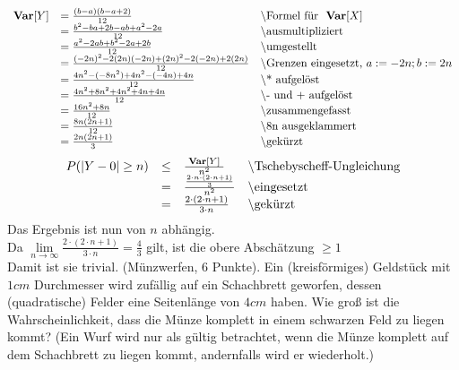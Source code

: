 \documentclass[twoside]{article}
\begin{document}
		\sss
		    \begin{equation*}
				\begin{array}{lll}
					\textbf{Var}[Y]	&=	\frac{(b-a)(b-a+2)}{12}	&$\textbackslash Formel für \var{X}$\\
									&=	\frac{b^2-ba+2b-ab+a^2-2a}{12}	&$\textbackslash ausmultipliziert$\\
									&=	\frac{a^2-2ab+b^2-2a+2b}{12}	&$\textbackslash umgestellt$\\
									&=	\frac{(-2n)^2-2(2n)(-2n)+(2n)^2-2(-2n)+2(2n)}{12}&$\textbackslash Grenzen eingesetzt, $a:=-2n; b:=2n\\
									&=	\frac{4n^2-(-8n^2)+4n^2-(-4n)+4n}{12}&$\textbackslash * aufgelöst$\\
									&=	\frac{4n^2+8n^2+4n^2+4n+4n}{12}&$\textbackslash - und + aufgelöst$\\
									&=	\frac{16n^2+8n}{12}&$\textbackslash zusammengefasst$\\
									&=	\frac{8n(2n+1)}{12}&$\textbackslash 8n ausgeklammert$\\
									&=	\frac{2n(2n+1)}{3}&$\textbackslash gekürzt$\\
				\end{array}
			\end{equation*}
		\sss
    \begin{equation*}
        \begin{array}{rlll}
            P(|Y-0| \geq n) &\leq& \frac{\text{\var{Y}}}{n^2}&$\textbackslash Tschebyscheff-Ungleichung$\\
            &=&\frac{\frac{2\cdot n \cdot(2\cdot n +1)}{3}}{n^2}&$\textbackslash eingesetzt$\\
            &=&\frac{2 \cdot(2\cdot n +1)}{3\cdot n}&$\textbackslash gekürzt$
        \end{array}
    \end{equation*}
    Das Ergebnis ist nun von $n$ abhängig.\\
    Da $\lim\limits_{n \to \infty}\frac{2 \cdot(2\cdot n +1)}{3\cdot n} = \frac{4}{3}$ gilt, ist die obere Abschätzung $\geq 1$\\
    Damit ist sie trivial.
		(Münzwerfen, 6 Punkte).
		Ein (kreisförmiges) Geldstück mit $1cm$ Durchmesser wird zufällig auf ein Schachbrett geworfen, dessen (quadratische) Felder eine Seitenlänge von $4cm$ haben.
		Wie groß ist die Wahrscheinlichkeit, dass die Münze komplett in einem schwarzen Feld zu liegen kommt?
		(Ein Wurf wird nur als gültig betrachtet, wenn die Münze komplett auf dem Schachbrett zu liegen kommt, andernfalls wird er wiederholt.)\\
\end{document}
